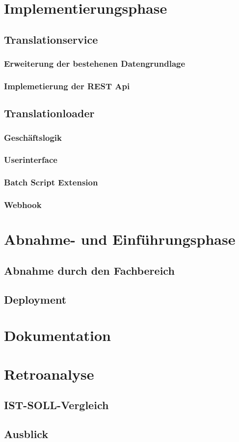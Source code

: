 \documentclass[12pt,a4paper,oneside]{article}
\begin{document}
    \section{Implementierungsphase}
    \subsection{Translationservice}
    \subsubsection{Erweiterung der bestehenen Datengrundlage}
    \subsubsection{Implemetierung der REST Api}
    \subsection{Translationloader}
    \subsubsection{Geschäftslogik}
    \subsubsection{Userinterface}
    \subsubsection{Batch Script Extension}
    \subsubsection{Webhook}
    \section{Abnahme- und Einführungsphase}
    \subsection{Abnahme durch den Fachbereich}
    \subsection{Deployment}
    \section{Dokumentation}
    \section{Retroanalyse}
    \subsection{IST-SOLL-Vergleich}
    \subsection{Ausblick}
\end{document}
